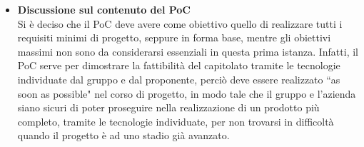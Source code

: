 \begin{itemize}
\begin{itemize}
        \end{itemize}
        \item \textbf{Discussione sul contenuto del PoC} \\
        Si è deciso che il PoC deve avere come obiettivo quello di realizzare tutti i requisiti minimi di progetto, seppure in forma base, mentre gli obiettivi massimi non sono da considerarsi essenziali in questa prima istanza. Infatti, il PoC serve per dimostrare la fattibilità del capitolato tramite le tecnologie individuate dal gruppo e dal proponente, perciò deve essere realizzato ``as soon as possible" nel corso di progetto, in modo tale che il gruppo e l'azienda siano sicuri di poter proseguire nella realizzazione di un prodotto più completo, tramite le tecnologie individuate, per non trovarsi in difficoltà quando il progetto è ad uno stadio già avanzato.
    \end{itemize}